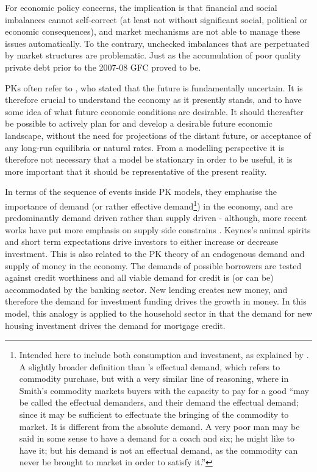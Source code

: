 \documentclass[
]{book}
\begin{document}
For economic policy concerns, the implication is that financial and social imbalances cannot self-correct (at least not without significant social, political or economic consequences), and market mechanisms are not able to manage these issues automatically. To the contrary, unchecked imbalances that are perpetuated by market structures are problematic. Just as the accumulation of poor quality private debt prior to the 2007-08 GFC proved to be.

PKs often refer to \citet{keynes1937}, who stated that the future is fundamentally uncertain. It is therefore crucial to understand the economy as it presently stands, and to have some idea of what future economic conditions are desirable. It should thereafter be possible to actively plan for and develop a desirable future economic landscape, without the need for projections of the distant future, or acceptance of any long-run equilibria or natural rates. From a modelling perspective it is therefore not necessary that a model be stationary in order to be useful, it is more important that it should be representative of the present reality.

In terms of the sequence of events inside PK models, they emphasise the importance of demand (or rather effective demand\footnote{Intended here to include both consumption and investment, as explained by \citet{keynes1937}. A slightly broader definition than \citet[pp.~73]{Smith1776}'s effectual demand, which refers to commodity purchase, but with a very similar line of reasoning, where in Smith's commodity markets buyers with the capacity to pay for a good ``may be called the effectual demanders, and their demand the effectual demand; since it may be sufficient to effectuate the bringing of the commodity to market. It is different from the absolute demand. A very poor man may be said in some sense to have a demand for a coach and six; he might like to have it; but his demand is not an effectual demand, as the commodity can never be brought to market in order to satisfy it.''}) in the economy, and are predominantly demand driven rather than supply driven - although, more recent works have put more emphasis on supply side constrains \citep{skott2008supplyside}. Keynes's animal spirits and short term expectations drive investors to either increase or decrease investment. This is also related to the PK theory of an endogenous demand and supply of money in the economy. The demands of possible borrowers are tested against credit worthiness and all viable demand for credit is (or can be) accommodated by the banking sector. New lending creates new money, and therefore the demand for investment funding drives the growth in money. In this model, this analogy is applied to the household sector in that the demand for new housing investment drives the demand for mortgage credit.
\end{document}
